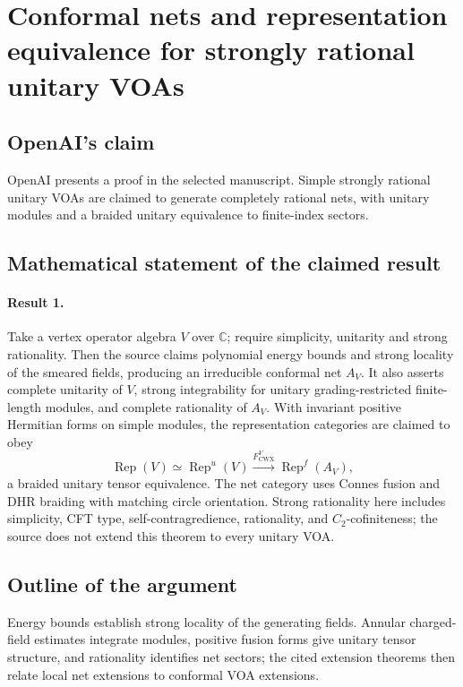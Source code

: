 \documentclass[11pt]{article}
\begin{document}
\section*{Conformal nets and representation equivalence for strongly rational unitary VOAs}

\subsection{OpenAI's claim}
OpenAI presents a proof in the selected manuscript. Simple strongly rational unitary VOAs are claimed to generate completely rational nets, with unitary modules and a braided unitary equivalence to finite-index sectors.

\subsection{Mathematical statement of the claimed result}
\paragraph{Result 1.} Take a vertex operator algebra \(V\) over \(\mathbb C\); require simplicity, unitarity and strong rationality. Then the source claims polynomial energy bounds and strong locality of the smeared fields, producing an irreducible conformal net \(A_V\). It also asserts complete unitarity of \(V\), strong integrability for unitary grading-restricted finite-length modules, and complete rationality of \(A_V\). With invariant positive Hermitian forms on simple modules, the representation categories are claimed to obey
\[
 \operatorname{Rep}(V)\simeq\operatorname{Rep}^{u}(V)
 \xrightarrow{F_{\mathrm{CWX}}^{V}}\operatorname{Rep}^{f}(A_V),
\]
a braided unitary tensor equivalence. The net category uses Connes fusion and DHR braiding with matching circle orientation. Strong rationality here includes simplicity, CFT type, self-contragredience, rationality, and \(C_2\)-cofiniteness; the source does not extend this theorem to every unitary VOA.

\subsection{Outline of the argument}
Energy bounds establish strong locality of the generating fields. Annular charged-field estimates integrate modules, positive fusion forms give unitary tensor structure, and rationality identifies net sectors; the cited extension theorems then relate local net extensions to conformal VOA extensions.
\end{document}
